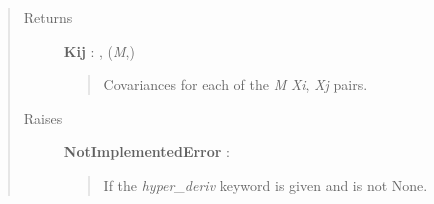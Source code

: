 \documentclass[letterpaper,10pt,english]{sphinxmanual}
\begin{document}
\begin{fulllineitems}
\begin{fulllineitems}
\begin{quote}
\begin{description}
\item[{Returns }] \leavevmode
\textbf{Kij} : , (\emph{M},)
\begin{quote}

Covariances for each of the \emph{M} \emph{Xi}, \emph{Xj} pairs.
\end{quote}

\item[{Raises }] \leavevmode
\textbf{NotImplementedError} :
\begin{quote}

If the \emph{hyper\_deriv} keyword is given and is not None.
\end{quote}

\end{description}\end{quote}

\end{fulllineitems}


\end{fulllineitems}

\end{document}

